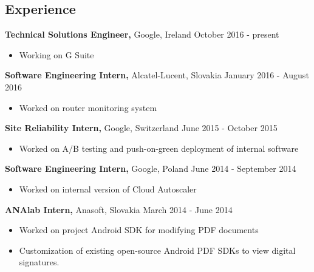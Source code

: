 \documentclass[margin]{res}
\begin{document}
\begin{resume}


\section{Experience}

{\bf Technical Solutions Engineer,} Google, Ireland \hfill October 2016 - present
\begin{itemize} \itemsep -2pt %
\item Working on G Suite
\end{itemize}

{\bf Software Engineering Intern,} Alcatel-Lucent, Slovakia \hfill January 2016 - August 2016
\begin{itemize} \itemsep -2pt %
\item Worked on router monitoring system
\end{itemize}

{\bf Site Reliability Intern,} Google, Switzerland \hfill June 2015 - October 2015
\begin{itemize} \itemsep -2pt %
\item Worked on A/B testing and push-on-green deployment of internal software
\end{itemize}

{\bf Software Engineering Intern,} Google, Poland \hfill June 2014 - September 2014
\begin{itemize} \itemsep -2pt %
\item Worked on internal version of Cloud Autoscaler
\end{itemize}

{\bf ANAlab Intern,} Anasoft, Slovakia \hfill March 2014 - June 2014
\begin{itemize} \itemsep -2pt  %
\item Worked on project Android SDK for modifying PDF documents
\item Customization of existing open-source Android PDF SDKs to view digital signatures.
\end{itemize}



\end{resume}
\end{document}
